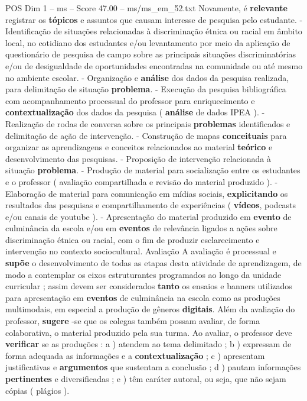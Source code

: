 \begin{textsample}{POS Dim 1 – ms – Score 47.00 – ms/ms\_em\_52.txt}
Novamente, é \textbf{relevante} registrar os \textbf{tópicos} e assuntos que causam interesse de pesquisa pelo estudante. - Identificação de situações relacionadas à discriminação étnica ou racial em âmbito local, no cotidiano dos estudantes e/ou levantamento por meio da aplicação de questionário de pesquisa de campo sobre as principais situações discriminatórias e/ou de desigualdade de oportunidades encontradas na comunidade ou até mesmo no ambiente escolar. - Organização e \textbf{análise} dos dados da pesquisa realizada, para delimitação de situação \textbf{problema}. - Execução da pesquisa bibliográfica com acompanhamento processual do professor para enriquecimento e \textbf{contextualização} dos dados da pesquisa ( \textbf{análise} de dados IPEA ). - Realização de rodas de conversa sobre os principais \textbf{problemas} identificados e delimitação de ação de intervenção. - Construção de mapas \textbf{conceituais} para organizar as aprendizagens e conceitos relacionados ao material \textbf{teórico} e desenvolvimento das pesquisas. - Proposição de intervenção relacionada à situação \textbf{problema}. - Produção de material para socialização entre os estudantes e o professor ( avaliação compartilhada e revisão do material produzido ). - Elaboração de material para comunicação em mídias sociais, \textbf{explicitando} os resultados das pesquisas e compartilhamento de experiências ( \textbf{vídeos}, podcasts e/ou canais de youtube ). - Apresentação do material produzido em \textbf{evento} de culminância da escola e/ou em \textbf{eventos} de relevância ligados a ações sobre discriminação étnica ou racial, com o fim de produzir esclarecimento e intervenção no contexto sociocultural.
Avaliação A avaliação é processual e \textbf{supõe} o desenvolvimento de todas as etapas desta atividade de aprendizagem, de modo a contemplar os eixos estruturantes programados ao longo da unidade curricular ; assim devem ser considerados \textbf{tanto} os ensaios e banners utilizados para apresentação em \textbf{eventos} de culminância na escola como as produções multimodais, em especial a produção de gêneros \textbf{digitais}.
Além da avaliação do professor, \textbf{sugere} -se que os colegas também possam avaliar, de forma colaborativa, o material produzido pela sua turma.
Ao avaliar, o professor deve \textbf{verificar} se as produções : a ) atendem ao tema delimitado ; b ) expressam de forma adequada as informações e a \textbf{contextualização} ; c ) apresentam justificativas e \textbf{argumentos} que sustentam a conclusão ; d ) pautam informações \textbf{pertinentes} e diversificadas ; e ) têm caráter autoral, ou seja, que não sejam cópias ( plágios ).

\end{textsample}
